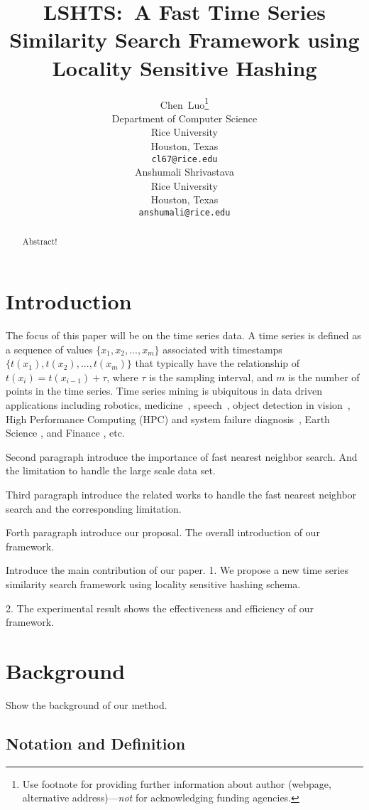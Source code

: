 \documentclass{article}
\title{LSHTS:~A Fast Time Series Similarity Search Framework using Locality Sensitive Hashing}
\author{
  Chen~Luo\thanks{Use footnote for providing further
    information about author (webpage, alternative
    address)---\emph{not} for acknowledging funding agencies.} \\
  Department of Computer Science\\
  Rice University\\
  Houston, Texas \\
  \texttt{cl67@rice.edu} \\
  \And
  Anshumali Shrivastava \\
  Rice University \\
  Houston, Texas \\
  \texttt{anshumali@rice.edu} \\
}
\begin{document}

\maketitle

\begin{abstract}
  Abstract!
\end{abstract}

\section{Introduction}

The focus of this paper will be on the time series data. A time series is defined as a sequence of values $\{x_1,x_2,...,x_m\}$
associated with timestamps $\{t(x_1), t(x_2),..., t(x_m)\}$ that typically have the relationship of $t(x_i) = t(x_{i-1})+\tau$, where $\tau$ is  the sampling interval, and $m$ is the number of points in the time series. Time series mining is ubiquitous in data driven applications including robotics, medicine~\cite{oates2000method,caracca2000discovering}, speech~\cite{rabiner1993fundamentals}, object detection in vision~\cite{yang2002detecting, sonka2014image}, High Performance Computing (HPC) and system failure diagnosis~\cite{luo2014correlating,sun2014querying}, Earth Science \cite{mudelsee2013climate}, and Finance \cite{granger2014forecasting}, etc.

Second paragraph introduce the importance of fast nearest neighbor search. And the limitation to handle the large scale data set.

Third paragraph introduce the related works to handle the fast nearest neighbor search and the corresponding limitation. 

Forth paragraph introduce our proposal. The overall introduction of our framework. 

Introduce the main contribution of our paper.
1. We propose a new time series similarity search framework using locality sensitive hashing schema.

2. The experimental result shows the effectiveness and efficiency of our framework.

\section{Background}
Show the background of our method.

\subsection{Notation and Definition}
\end{document}
